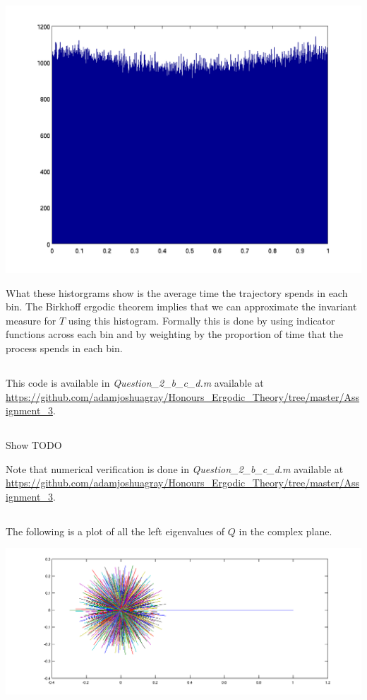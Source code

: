 \documentclass{unswmaths}
\begin{document}
\includegraphics[scale=0.3]{qn_2_a_hist_10}

What these historgrams show is the average time the trajectory spends in each bin. The Birkhoff ergodic theorem implies that we can approximate the invariant measure for $ T $ using this histogram. Formally this is done by using indicator functions across each bin and by weighting by the proportion of time that the process spends in each bin.

\subsection{}
This code is available in \emph{Question\_2\_b\_c\_d.m} available at \url{https://github.com/adamjoshuagray/Honours_Ergodic_Theory/tree/master/Assignment_3}.

\subsection{}
Show TODO

Note that numerical verification is done in  \emph{Question\_2\_b\_c\_d.m} available at \url{https://github.com/adamjoshuagray/Honours_Ergodic_Theory/tree/master/Assignment_3}.

\subsection{}
The following is a plot of all the left eigenvalues of $ Q $ in the complex plane. 


\includegraphics[scale=0.4]{qn_2_eigenvalues}
\end{document}
